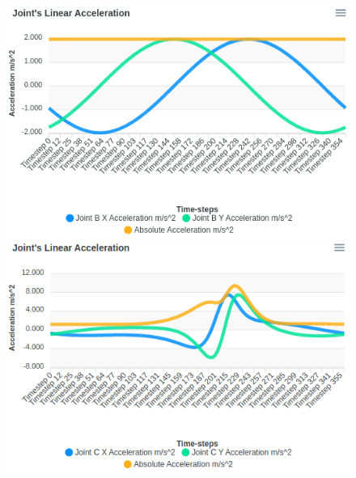 \documentclass[12pt]{article}
\begin{document}
\begin{figure}[ht]
  \centering

  \includegraphics[scale=0.45]{../pmks-plots/linJointAcc/linJointAccB.png}%
  \includegraphics[scale=0.45]{../pmks-plots/linJointAcc/linJointAccC.png}


\end{figure}
\end{document}
